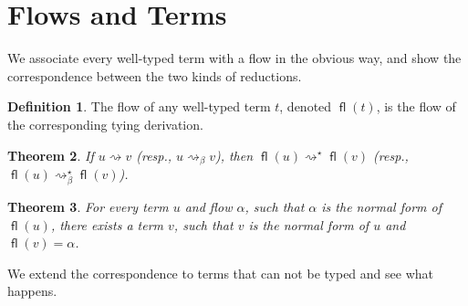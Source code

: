 \documentclass[11pt,a4paper]{article}
\theoremstyle{definition}
\newtheorem{definition}{Definition}
\theoremstyle{plain}
\newtheorem{theorem}[definition]{Theorem}
\theoremstyle{remark}
\begin{document}
\section{Flows and Terms}

We associate every well-typed term with a flow in the obvious way, and show the correspondence between the two kinds of reductions.

\newcommand{\fl}{{\mathop{\mathsf{fl}}}}

\begin{definition}
	The flow of any well-typed term $t$, denoted $\fl(t)$, is the flow of the corresponding tying derivation.
\end{definition}

\begin{theorem}
	If $u\rightsquigarrow v$ (resp., $u\rightsquigarrow_\beta v$), then $\fl(u)\rightsquigarrow^\star\fl(v)$ (resp., $\fl(u)\rightsquigarrow^\star_\beta\fl(v)$).
\end{theorem}

\begin{theorem}
	For every term $u$ and flow $\alpha$, such that $\alpha$ is the normal form of $\fl(u)$, there exists a term $v$, such that $v$ is the normal form of $u$ and $\fl(v)=\alpha$.
\end{theorem}

We extend the correspondence to terms that can not be typed and see what happens.
\end{document}
